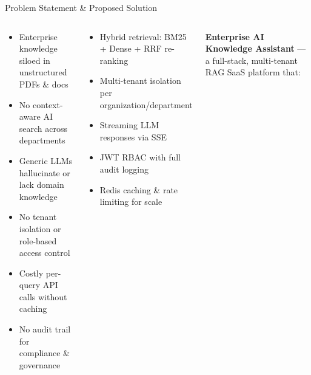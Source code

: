 \documentclass[aspectratio=169,12pt]{beamer}
\begin{document}
\begin{frame}{Problem Statement \& Proposed Solution}
\begin{columns}[T]
  \begin{tcolorbox}[mybox,title={\faExclamationTriangle\; Problems}]
    \footnotesize
    \begin{itemize}
      \item[\color{warn}$\bullet$] Enterprise knowledge siloed in unstructured PDFs \& docs
      \item[\color{warn}$\bullet$] No context-aware AI search across departments
      \item[\color{warn}$\bullet$] Generic LLMs hallucinate or lack domain knowledge
      \item[\color{warn}$\bullet$] No tenant isolation or role-based access control
      \item[\color{warn}$\bullet$] Costly per-query API calls without caching
      \item[\color{warn}$\bullet$] No audit trail for compliance \& governance
    \end{itemize}
  \end{tcolorbox}
  \vspace{4pt}
  \begin{tcolorbox}[mybox,title={\faBullseye\; Objectives}]
    \footnotesize
    \begin{itemize}
      \item Hybrid retrieval: BM25 + Dense + RRF re-ranking
      \item Multi-tenant isolation per organization/department
      \item Streaming LLM responses via SSE
      \item JWT RBAC with full audit logging
      \item Redis caching \& rate limiting for scale
    \end{itemize}
  \end{tcolorbox}

  \begin{tcolorbox}[mybox,title={\faLightbulb\; Proposed Solution}]
    \footnotesize
    \textbf{Enterprise AI Knowledge Assistant} — a full-stack, multi-tenant RAG SaaS platform that:
    \vspace{4pt}


\end{tcolorbox}
\end{columns}
\end{frame}
\end{document}
